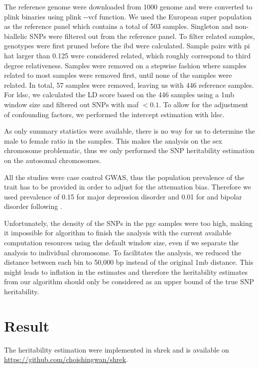 	The reference genome were downloaded from 1000 genome \citep{Project2012} and were converted to plink binaries using plink -{}-vcf function. 
	We used the European super population as the reference panel which contains a total of 503 samples.
	Singleton and non-biallelic \glspl{SNP} were filtered out from the reference panel.
	To filter related samples, genotypes were first pruned before the \gls{ibd} were calculated.
	Sample pairs with pi hat larger than 0.125 were considered related, which roughly correspond to third degree relativeness. 
	Samples were removed on a stepwise fashion where samples related to most samples were removed first, until none of the samples were related. 
	In total, 57 samples were removed, leaving us with 446 reference samples. 
	For \gls{ldsc}, we calculated the \gls{LD} score based on the 446 samples using a 1\gls{mb} window size and filtered out \glspl{SNP} with \gls{maf} $<0.1$.
	To allow for the adjustment of confounding factors, we performed the intercept estimation with \gls{ldsc}.
	
	As only summary statistics were available, there is no way for us to determine the male to female ratio in the samples. 
	This makes the analysis on the sex chromosome problematic, thus we only performed the \gls{SNP} heritability estimation on the autosomal chromosomes.
	
	All the studies were case control \gls{GWAS}, thus the population prevalence of the trait has to be provided in order to adjust for the attenuation bias. 
	Therefore we used prevalence of 0.15 for major depression disorder and 0.01 for  and bipolar disorder following \citet{Bulik-Sullivan2015}.

	Unfortunately, the density of the \glspl{SNP} in the \gls{pgc}  samples were too high, making it impossible for algorithm to finish the analysis with the current available computation resources using the default window size, even if we separate the analysis to individual chromosome.
	To facilitates the analysis, we reduced the distance between each bin to 50,000 bp instead of the original 1\gls{mb} distance. 
	This might leads to inflation in the estimates and therefore the heritability estimates from our algorithm should only be considered as an upper bound of the true \gls{SNP} heritability.
	
	
	\section{Result}
		The heritability estimation were implemented in \gls{shrek} and is available on \url{https://github.com/choishingwan/shrek}.  
